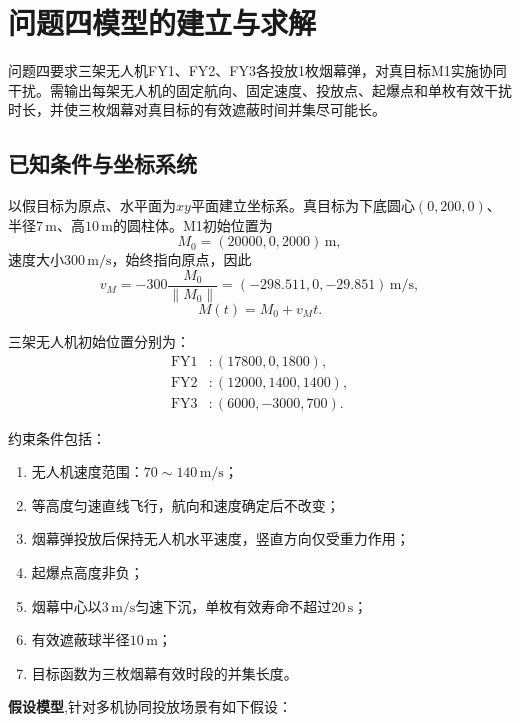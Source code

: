 \documentclass[12pt,a4paper]{article}
\begin{document}
	\section{问题四模型的建立与求解}
	
	
	问题四要求三架无人机FY1、FY2、FY3各投放1枚烟幕弹，对真目标M1实施协同干扰。需输出每架无人机的固定航向、固定速度、投放点、起爆点和单枚有效干扰时长，并使三枚烟幕对真目标的有效遮蔽时间并集尽可能长。
	
	\subsection{已知条件与坐标系统}
	
	以假目标为原点、水平面为$xy$平面建立坐标系。真目标为下底圆心$(0,200,0)$、半径$7\,\text{m}$、高$10\,\text{m}$的圆柱体。M1初始位置为
	\begin{equation}
		M_0=(20000,0,2000)\,\text{m},
	\end{equation}
	速度大小$300\,\text{m/s}$，始终指向原点，因此
	\begin{equation}
		v_M=-300\frac{M_0}{\|M_0\|}=(-298.511,0,-29.851)\,\text{m/s},
	\end{equation}
	\begin{equation}
		M(t)=M_0+v_M t.
	\end{equation}
	
	三架无人机初始位置分别为：
	\begin{align}
		\text{FY1} &: (17800,0,1800),\\
		\text{FY2} &: (12000,1400,1400),\\
		\text{FY3} &: (6000,-3000,700).
	\end{align}
	
	约束条件包括：
	\begin{enumerate}[label=(\arabic*)]
		\item 无人机速度范围：$70\sim140\,\text{m/s}$；
		\item 等高度匀速直线飞行，航向和速度确定后不改变；
		\item 烟幕弹投放后保持无人机水平速度，竖直方向仅受重力作用；
		\item 起爆点高度非负；
		\item 烟幕中心以$3\,\text{m/s}$匀速下沉，单枚有效寿命不超过$20\,\text{s}$；
		\item 有效遮蔽球半径$10\,\text{m}$；
		\item 目标函数为三枚烟幕有效时段的并集长度。
	\end{enumerate}
	
	\textbf{假设模型},针对多机协同投放场景\cite{zhao2026}有如下假设：
	
\end{document}
